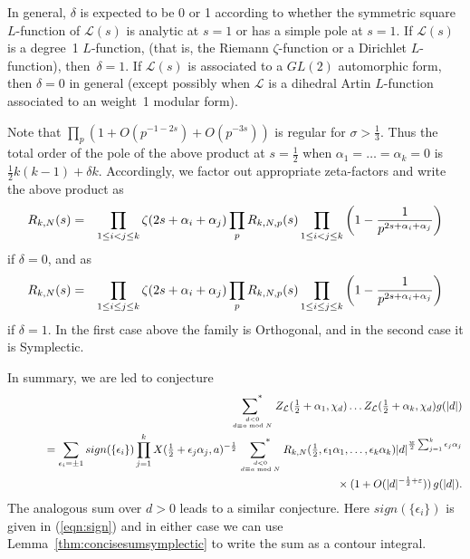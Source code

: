 \documentclass[12pt,letterpaper]{amsart}
\theoremstyle{plain}
\theoremstyle{definition}
\theoremstyle{remark}
\numberwithin{equation}{subsection}
\numberwithin{theorem}{subsection}
\numberwithin{table}{subsection}
\newcommand{\ontop}[2]{\genfrac{}{}{0pt}{}{#1}{#2}}
\def\sumstar{\operatornamewithlimits{\sum\nolimits^*}}
\begin{document}
In general, $\delta$ is expected to be 0 or 1
according to whether the symmetric square $L$-function
of $\mathcal{L}(s)$ is analytic at $s=1$ 
or has a simple pole at $s=1$. 
If $\mathcal{L}(s)$ is a degree~1 $L$-function, (that is, the 
Riemann $\zeta$-function or a Dirichlet $L$-function), then~$\delta=1$.
If $\mathcal{L}(s)$ is associated to a $GL(2)$ automorphic
form, then $\delta=0$ in general (except possibly when $\mathcal{L}$ is a
dihedral  Artin
$L$-function associated to an weight~1 modular form). 

Note that $\prod_p (1+O(p^{-1-2s})+O(p^{-3s} ))$ is regular 
for $\sigma>\frac13$.  
Thus the total order of the pole of the above product at
$s=\frac12$ when 
$\alpha_1=\dots =\alpha_k=0$
is $\frac12 k(k-1)+\delta k$.
Accordingly, we factor out appropriate zeta-factors
and write the above product as
\begin{eqnarray}
R_{k,N}(s)&=& \prod_{1\le i < j \le k} \zeta (2s+\alpha_i+\alpha_j) \prod_p
R_{k,N,p}(s) \prod_{1\le i< j\le k}
\left(1-\frac{1}{p^{2s+\alpha_i+\alpha_j}}\right) \cr
\end{eqnarray}
if $\delta = 0$, and as
\begin{eqnarray}
R_{k,N}(s)&=& \prod_{1\le i \le j \le k} \zeta (2s+\alpha_i+\alpha_j)
\prod_p R_{k,N,p}(s) \prod_{1\le i \le j\le k}
\left(1-\frac{1}{p^{2s+\alpha_i+\alpha_j}}\right) \cr
\end{eqnarray}
if $\delta=1$.  
In the first case above the family is Orthogonal, and in the second
case it is Symplectic.

In summary, we are led to conjecture
 \begin{eqnarray}\label{thm:Lhalfchidsum}&   &\sumstar_{  \ontop{d<0}{d\equiv a \bmod N}}
Z_\mathcal{L}(\tfrac12 +\alpha_1,\chi_d)\dots
        Z_\mathcal{L}(\tfrac12 +\alpha_k,\chi_d)g(|d|)\nonumber \\
&   &\phantom{xxxx} =
 \sum_{\epsilon_i=\pm 1}
sign(\{\epsilon_i\})
\prod_{j=1}^k X(\tfrac12 +\epsilon_j\alpha_j,a)^{-\frac 12}
\sumstar_{ \ontop{d<0}{d \equiv a \bmod N}}
R_{k,N}(\tfrac12 ,\epsilon_1\alpha_1, \dots, \epsilon_k\alpha_k)
  |d|^{\frac w 2 \sum_{j=1}^k\epsilon_j \alpha_j}  \nonumber \\
&   &\phantom{xxxxxxxxxxxxxxxxxxxxxXXXXXXXXXX}
\times(1+ O(|d|^{-\frac 12+\varepsilon}))\,g(|d|) . \nonumber \\
\end{eqnarray}
The analogous sum over $d>0$ leads to a similar conjecture.
Here $sign(\{\epsilon_i\})$ is given in (\ref{eqn:sign}) and in 
either case we can use Lemma~\ref{thm:concisesumsymplectic} to write the sum as a 
contour integral.
\end{document}
